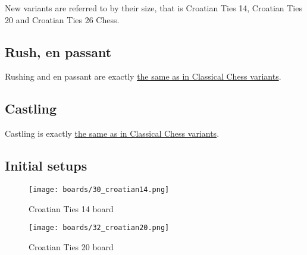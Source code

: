 New variants are referred to by their size, that is Croatian Ties 14, Croatian
Ties 20 and Croatian Ties 26 Chess.

\subsection*{Rush, en passant}
\label{sec:Simple variants/Croatian Ties variants/Rush, en passant}

Rushing and en passant are exactly
\hyperref[sec:Simple variants/Classical Chess variants/Rush, en passant]{the same as in Classical Chess variants}.

\subsection*{Castling}
\label{sec:Simple variants/Croatian Ties variants/Castling}

Castling is exactly
\hyperref[sec:Simple variants/Classical Chess variants/Castling]{the same as in Classical Chess variants}.

\vfill{}

\clearpage %

\subsection*{Initial setups}
\label{sec:Simple variants/Croatian Ties variants/Initial setups}

\noindent
\begin{figure}[h]
\texttt{[image: boards/30\_croatian14.png]}
\caption{Croatian Ties 14 board}
\label{fig:30_croatian14}
\end{figure}

\TODO

\vfill{}

\clearpage %

\noindent
\begin{figure}[h]
\texttt{[image: boards/32\_croatian20.png]}
\caption{Croatian Ties 20 board}
\label{fig:32_croatian20}
\end{figure}

\TODO

\vfill{}

